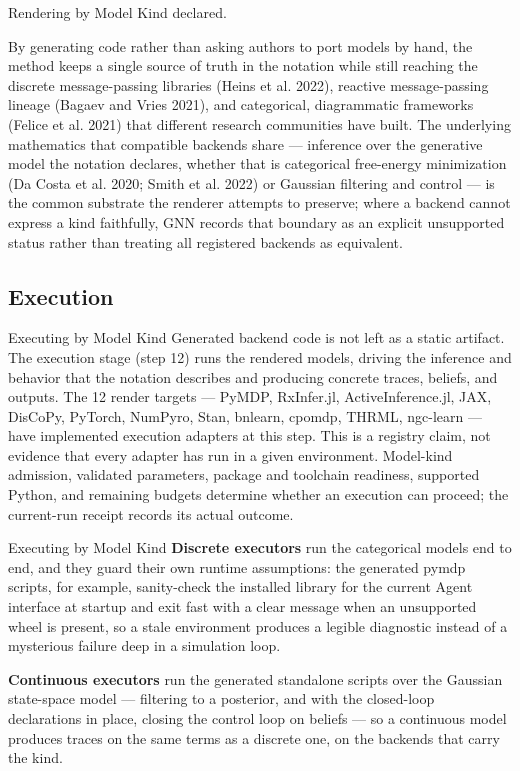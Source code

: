 \documentclass[
  ignorenonframetext,
]{beamer}
\begin{document}
\begin{frame}{Rendering by Model Kind}
declared.

By generating code rather than asking authors to port models by hand,
the method keeps a single source of truth in the notation while still
reaching the discrete message-passing libraries (Heins et al. 2022),
reactive message-passing lineage (Bagaev and Vries 2021), and
categorical, diagrammatic frameworks (Felice et al. 2021) that different
research communities have built. The underlying mathematics that
compatible backends share --- inference over the generative model the
notation declares, whether that is categorical free-energy minimization
(Da Costa et al. 2020; Smith et al. 2022) or Gaussian filtering and
control --- is the common substrate the renderer attempts to preserve;
where a backend cannot express a kind faithfully, GNN records that
boundary as an explicit unsupported status rather than treating all
registered backends as equivalent.
\end{frame}

\subsection{Execution}\label{execution}

\begin{frame}{Executing by Model Kind}
\protect{}\label{executing-by-model-kind}
Generated backend code is not left as a static artifact. The execution
stage (step 12) runs the rendered models, driving the inference and
behavior that the notation describes and producing concrete traces,
beliefs, and outputs. The 12 render targets --- PyMDP, RxInfer.jl,
ActiveInference.jl, JAX, DisCoPy, PyTorch, NumPyro, Stan, bnlearn,
cpomdp, THRML, ngc-learn --- have implemented execution adapters at this
step. This is a registry claim, not evidence that every adapter has run
in a given environment. Model-kind admission, validated parameters,
package and toolchain readiness, supported Python, and remaining budgets
determine whether an execution can proceed; the current-run receipt
records its actual outcome.

\end{frame}

\begin{frame}{Executing by Model Kind}
\textbf{Discrete executors} run the categorical models end to end, and
they guard their own runtime assumptions: the generated pymdp scripts,
for example, sanity-check the installed library for the current Agent
interface at startup and exit fast with a clear message when an
unsupported wheel is present, so a stale environment produces a legible
diagnostic instead of a mysterious failure deep in a simulation loop.

\textbf{Continuous executors} run the generated standalone scripts over
the Gaussian state-space model --- filtering to a posterior, and with
the closed-loop declarations in place, closing the control loop on
beliefs --- so a continuous model produces traces on the same terms as a
discrete one, on the backends that carry the kind.

\end{frame}
\end{document}

